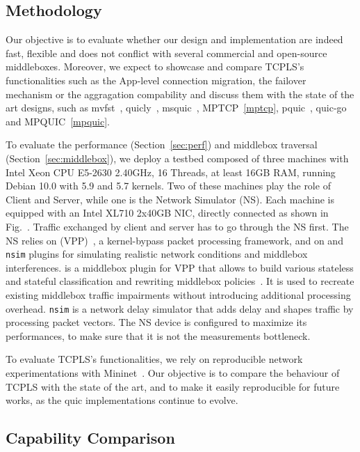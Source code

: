 \subsection{Methodology}

Our objective is to evaluate whether our design and implementation are indeed
fast, flexible and does not conflict with several commercial and open-source
middleboxes. Moreover, we expect to showcase and compare TCPLS's functionalities
such as the App-level connection migration, the failover mechanism or the
aggragation compability and discuss them  with the state
of the art designs, such as mvfst~\cite{mvfast}, quicly~\cite{quicly},
msquic~\cite{msquic}, MPTCP~\ref{mptcp}, pquic~\cite{pquic},
quic-go~\cite{quic-go} and MPQUIC~\ref{mpquic}.

To evaluate the performance (Section~\ref{sec:perf}) and middlebox traversal
(Section~\ref{sec:middlebox}), we deploy a testbed composed of three machines with Intel Xeon CPU E5-2630
2.40GHz, 16 Threads, at least 16GB RAM, running Debian 10.0 with 5.9 and
5.7 kernels. Two of these machines play the role of Client and Server,
while one is the Network Simulator (NS). Each machine is equipped with an
Intel XL710 2x40GB NIC, directly connected as shown in Fig.~.
Traffic exchanged by client and server has to go through the NS first.
The NS relies on  (VPP)~\cite{vpp}, a
kernel-bypass packet processing framework, and on \mmb and \texttt{nsim}
plugins for simulating realistic network conditions and middlebox
interferences. \mmb is a middlebox plugin for VPP that allows to build various
stateless and stateful classification and rewriting middlebox
policies~\cite{edeline2019mmb}. It is used to recreate existing middlebox
traffic impairments without introducing additional processing overhead.
\texttt{nsim} is a network delay simulator that adds delay and shapes traffic
by processing packet vectors. The NS device is configured to maximize
its performances, to make sure that it is not the measurements bottleneck.

To evaluate TCPLS's functionalities, we rely on reproducible network
experimentations with Mininet~\cite{mininet}. Our objective is to compare the
behaviour of TCPLS with the state of the art, and to make it easily
reproducible for future works, as the quic implementations continue to evolve.

\subsection{Capability Comparison}

